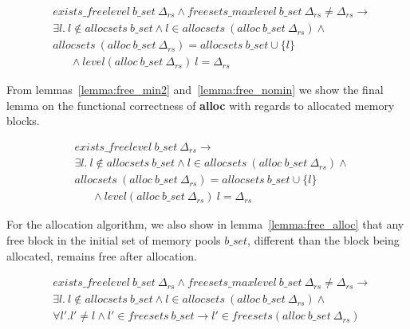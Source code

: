 \begin{lemma} 
\label{lemma:free_nomin}
\end{lemma}
\vspace{-7pt}
{\footnotesize
\begin{align*}
&exists\_freelevel\ b\_set\  \Delta_{rs} \wedge freesets\_maxlevel\ b\_set\  \Delta_{rs} \neq  \Delta_{rs} \longrightarrow  \\
&\exists l.\ l \notin allocsets\ b\_set \wedge l \in allocsets\ (alloc\ b\_set\  \Delta_{rs}) \wedge \\
&allocsets\ (alloc\ b\_set\  \Delta_{rs}) = allocsets\ b\_set \cup \lbrace l \rbrace  \\
&\ \ \ \ \ \ \ \wedge level (alloc\ b\_set\ \Delta_{rs})\ l = \Delta_{rs} 
\end{align*}
}
\vspace{-12pt}

From lemmas~\ref{lemma:free_min2} and~\ref{lemma:free_nomin} we show the final lemma on the functional correctness of \textbf{alloc} with regards to allocated memory blocks. 

\begin{lemma} [Allocsets]
	\label{lemma:free}
\end{lemma}
\vspace{-7pt}
{\footnotesize
	\begin{align*}
	&exists\_freelevel\ b\_set\  \Delta_{rs} \longrightarrow  \\
	&\exists l.\ l \notin allocsets\ b\_set \wedge l \in allocsets\ (alloc\ b\_set\  \Delta_{rs}) \wedge \\
	&allocsets\ (alloc\ b\_set\  \Delta_{rs}) = allocsets\ b\_set \cup \lbrace l \rbrace  \\
	&\ \ \ \ \ \ \ \wedge level (alloc\ b\_set\ \Delta_{rs})\ l = \Delta_{rs} 
	\end{align*}
}
\vspace{-12pt}


For the allocation algorithm, we also show in lemma~\ref{lemma:free_alloc} that any free block in the initial set of memory pools $b\_set$, different than the block being allocated, remains free after allocation.

\begin{lemma} 
	\label{lemma:free_alloc}
\end{lemma}
\vspace{-7pt}
{\footnotesize
	\begin{align*}
	&exists\_freelevel\ b\_set\  \Delta_{rs} \wedge freesets\_maxlevel\ b\_set\  \Delta_{rs} \neq  \Delta_{rs} \longrightarrow  \\
	&\exists l.\ l \notin allocsets\ b\_set \wedge l \in allocsets\ (alloc\ b\_set\  \Delta_{rs}) \wedge \\
	& \forall l'. l'\neq l \wedge l' \in freesets\ b\_set \longrightarrow l' \in freesets (alloc\ b\_set\  \Delta_{rs}) 
	\end{align*}
}
\vspace{-12pt}


